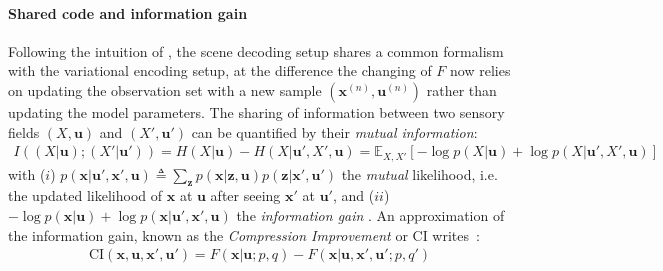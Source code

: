 \documentclass{article}
\begin{document}
\paragraph{Shared code and information gain}
Following the intuition of \cite{friston2012perceptions}, the scene decoding setup shares a common formalism with the variational encoding setup, at the difference the changing of $F$ now relies on updating the observation set
with a new sample $(\boldsymbol{x}^{(n)}, \boldsymbol{u}^{(n)})$ rather than updating the model parameters.
The sharing of information between two sensory fields $(X, \boldsymbol{u})$ and $(X', \boldsymbol{u}')$ can be quantified by their \emph{mutual information}:
\begin{align}
I((X| \boldsymbol{u}); (X'| \boldsymbol{u}')) = H(X| \boldsymbol{u}) - H(X| \boldsymbol{u}', X', \boldsymbol{u})
= \mathbb{E}_{X,X'} \left[-\log p(X| \boldsymbol{u}) + \log p(X| \boldsymbol{u}', X', \boldsymbol{u})\right] \nonumber
\end{align}
with 
($i$) $ p(\boldsymbol{x}| \boldsymbol{u}', \boldsymbol{x}', \boldsymbol{u}) \triangleq \sum_{\boldsymbol{z}} p(\boldsymbol{x}|\boldsymbol{z}, \boldsymbol{u}) p(\boldsymbol{z}|\boldsymbol{x}', \boldsymbol{u}')$ 
the \emph{mutual} likelihood, i.e. the updated likelihood of $\boldsymbol{x}$ at $\boldsymbol{u}$ after seeing $\boldsymbol{x}'$ at $\boldsymbol{u}'$,
and ($ii$) 
$-\log p(\boldsymbol{x}| \boldsymbol{u}) + \log p(\boldsymbol{x}| \boldsymbol{u}', \boldsymbol{x}', \boldsymbol{u})$ the 
\emph{information gain} \citep{tishby2011information}.
An approximation of the information gain, known as the \emph{Compression Improvement} or CI \citep{schmidhuber2007simple,houthooft2016vime}
writes~:
\begin{align}
\text{CI}(\boldsymbol{x},\boldsymbol{u}, \boldsymbol{x}', \boldsymbol{u}') = F(\boldsymbol{x}|\boldsymbol{u};p,q) - F(\boldsymbol{x}|\boldsymbol{u}, \boldsymbol{x}', \boldsymbol{u}';p,q') 
\end{align}	
\end{document}
